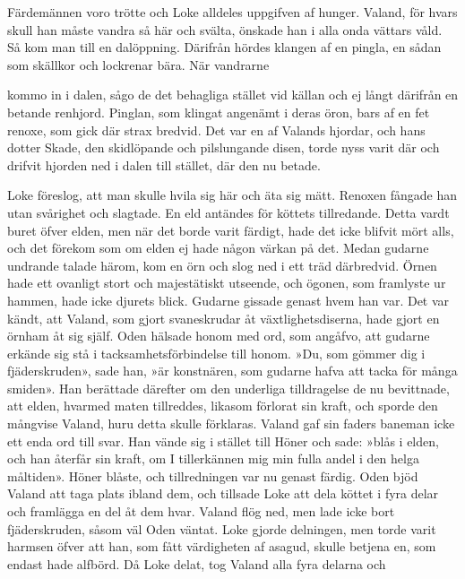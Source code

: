 Färdemännen voro trötte och Loke alldeles uppgifven af hunger. Valand,
för hvars skull han måste vandra så här och svälta, önskade han i alla
onda vättars våld. Så kom man till en dalöppning. Därifrån hördes
klangen af en pingla, en sådan som skällkor och lockrenar bära. När
vandrarne

kommo in i dalen, sågo de det behagliga stället vid källan och ej långt
därifrån en betande renhjord. Pinglan, som klingat angenämt i deras
öron, bars af en fet renoxe, som gick där strax bredvid. Det var en af
Valands hjordar, och hans dotter Skade, den skidlöpande och pilslungande
disen, torde nyss varit där och drifvit hjorden ned i dalen till
stället, där den nu betade.

Loke föreslog, att man skulle hvila sig här och äta sig mätt. Renoxen
fångade han utan svårighet och slagtade. En eld antändes för köttets
tillredande. Detta vardt buret öfver elden, men när det borde varit
färdigt, hade det icke blifvit mört alls, och det förekom som om elden
ej hade någon värkan på det. Medan gudarne undrande talade härom, kom en
örn och slog ned i ett träd därbredvid. Örnen hade ett ovanligt stort
och majestätiskt utseende, och ögonen, som framlyste ur hammen, hade
icke djurets blick. Gudarne gissade genast hvem han var. Det var kändt,
att Valand, som gjort svaneskrudar åt växtlighetsdiserna, hade gjort en
örnham åt sig själf. Oden hälsade honom med ord, som angåfvo, att
gudarne erkände sig stå i tacksamhetsförbindelse till honom. »Du, som
gömmer dig i fjäderskruden», sade han, »är konstnären, som gudarne hafva
att tacka för många smiden». Han berättade därefter om den underliga
tilldragelse de nu bevittnade, att elden, hvarmed maten tillreddes,
likasom förlorat sin kraft, och sporde den mångvise Valand, huru detta
skulle förklaras. Valand gaf sin faders baneman icke ett enda ord till
svar. Han vände sig i stället till Höner och sade: »blås i elden, och
han återfår sin kraft, om I tillerkännen mig min fulla andel i den helga
måltiden». Höner blåste, och tillredningen var nu genast färdig. Oden
bjöd Valand att taga plats ibland dem, och tillsade Loke att dela köttet
i fyra delar och framlägga en del åt dem hvar. Valand flög ned, men lade
icke bort fjäderskruden, såsom väl Oden väntat. Loke gjorde delningen,
men torde varit harmsen öfver att han, som fått värdigheten af asagud,
skulle betjena en, som endast hade alfbörd. Då Loke delat, tog Valand
alla fyra delarna och

